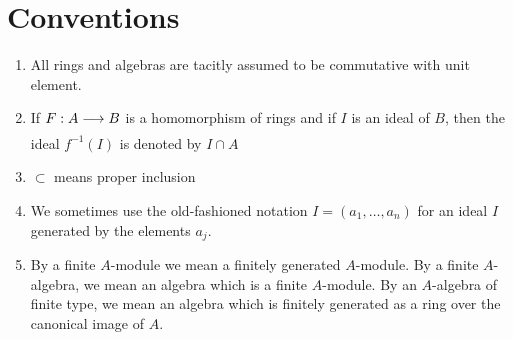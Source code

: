 \documentclass[../main]{subfiles}
\begin{document}
\chapter*{Conventions}\label{conventions} 

\begin{enumerate}[label = \arabic*.]
    \item All rings and algebras are tacitly assumed to be commutative with unit element.
    \item If $F:A\varrightarrow{} B$ is a homomorphism of rings and if $I$ is an ideal of $B$, then the ideal $f^{-1}(I)$ is denoted by $I\cap A$
    \item $\subset$ means proper inclusion
    \item We sometimes use the old-fashioned notation $I = (a_1, \dots , a_n)$ for an ideal $I$ generated by the elements $a_j$.
    \item By a finite $A$-module we mean a finitely generated $A$-module. By a finite $A$-algebra, we mean an algebra which is a finite $A$-module. By an $A$-algebra of finite type, we mean an algebra which is finitely generated as a ring over the canonical image of $A$. 
\end{enumerate}
\end{document}
